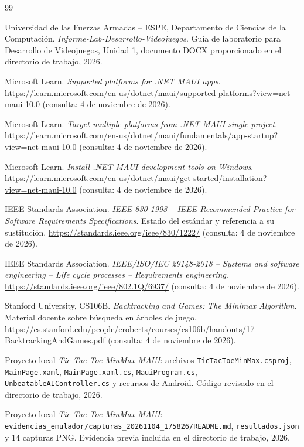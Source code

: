 \begin{thebibliography}{99}
\raggedright
\setlength{\itemsep}{0.35em}
Universidad de las Fuerzas Armadas -- ESPE, Departamento de Ciencias de la Computación.
\emph{Informe-Lab-Desarrollo-Videojuegos}. Guía de laboratorio para Desarrollo de Videojuegos, Unidad 1, documento DOCX proporcionado en el directorio de trabajo, 2026.

Microsoft Learn.
\emph{Supported platforms for .NET MAUI apps}.
\url{https://learn.microsoft.com/en-us/dotnet/maui/}\allowbreak\url{supported-platforms?view=net-maui-10.0}
(consulta: 4 de noviembre de 2026).

Microsoft Learn.
\emph{Target multiple platforms from .NET MAUI single project}.
\url{https://learn.microsoft.com/en-us/dotnet/maui/}\allowbreak\url{fundamentals/app-startup?view=net-maui-10.0}
(consulta: 4 de noviembre de 2026).

Microsoft Learn.
\emph{Install .NET MAUI development tools on Windows}.
\url{https://learn.microsoft.com/en-us/dotnet/maui/}\allowbreak\url{get-started/installation?view=net-maui-10.0}
(consulta: 4 de noviembre de 2026).

IEEE Standards Association.
\emph{IEEE 830-1998 -- IEEE Recommended Practice for Software Requirements Specifications}.
Estado del estándar y referencia a su sustitución.
\url{https://standards.ieee.org/ieee/830/1222/}
(consulta: 4 de noviembre de 2026).

IEEE Standards Association.
\emph{IEEE/ISO/IEC 29148-2018 -- Systems and software engineering -- Life cycle processes -- Requirements engineering}.
\url{https://standards.ieee.org/ieee/802.1Q/6937/}
(consulta: 4 de noviembre de 2026).

Stanford University, CS106B.
\emph{Backtracking and Games: The Minimax Algorithm}.
Material docente sobre búsqueda en árboles de juego.
\url{https://cs.stanford.edu/people/}\allowbreak\url{eroberts/courses/cs106b/}\allowbreak\url{handouts/17-BacktrackingAndGames.pdf}
(consulta: 4 de noviembre de 2026).

Proyecto local \emph{Tic-Tac-Toe MinMax MAUI}: archivos \texttt{TicTacToeMinMax.csproj}, \texttt{MainPage.xaml}, \texttt{MainPage.xaml.cs}, \texttt{MauiProgram.cs}, \texttt{UnbeatableAIController.cs} y recursos de Android. Código revisado en el directorio de trabajo, 2026.

Proyecto local \emph{Tic-Tac-Toe MinMax MAUI}: \texttt{evidencias\_emulador/}\allowbreak\texttt{capturas\_20261104\_175826/README.md}, \texttt{resultados.json} y 14 capturas PNG. Evidencia previa incluida en el directorio de trabajo, 2026.
\end{thebibliography}

